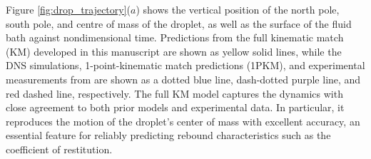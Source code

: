 \documentclass{jfm}
\begin{document}
Figure \ref{fig:drop_trajectory}($a$) shows the vertical position of the north pole, south pole, and centre of mass of the droplet, as well as the surface of the fluid bath against nondimensional time. Predictions from the full kinematic match (KM) developed in this manuscript are shown as yellow solid lines, while the DNS simulations, 1-point-kinematic match predictions (1PKM), and experimental measurements from \cite{AlventosaEtAl2023} are shown as a dotted blue line, dash-dotted purple line, and red dashed line, respectively. The full KM model captures the dynamics with close agreement to both prior models and experimental data. In particular, it reproduces the motion of the droplet’s center of mass with excellent accuracy, an essential feature for reliably predicting rebound characteristics such as the coefficient of restitution. 
\end{document}
